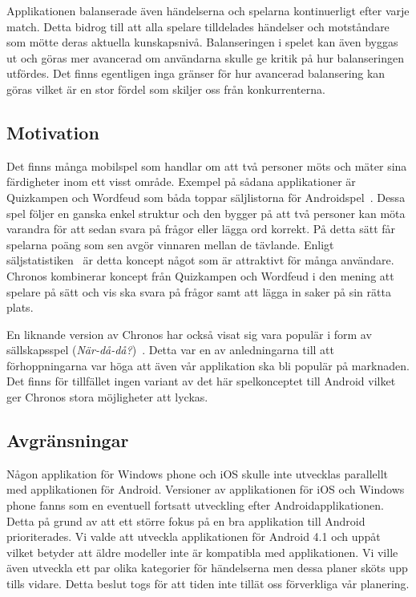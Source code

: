 \documentclass[a4paper, 11pt]{article}
\begin{document}
Applikationen balanserade även händelserna och spelarna kontinuerligt efter varje match. Detta bidrog till att alla spelare tilldelades händelser och motståndare som mötte deras aktuella kunskapsnivå. Balanseringen i spelet kan även byggas ut och göras mer avancerad om användarna skulle ge kritik på hur balanseringen utfördes. Det finns egentligen inga gränser för hur avancerad balansering kan göras vilket är en stor fördel som skiljer oss från konkurrenterna.


\subsection{Motivation}
Det finns många mobilspel som handlar om att två personer möts och mäter sina färdigheter inom ett visst område. Exempel på sådana applikationer är Quizkampen och Wordfeud som båda toppar säljlistorna för Androidspel~\cite{appsalesrating}. Dessa spel följer en ganska enkel struktur och den bygger på att två personer kan möta varandra för att sedan svara på frågor eller lägga ord korrekt. På detta sätt får spelarna poäng som sen avgör vinnaren mellan de tävlande. Enligt säljstatistiken~\cite{appsalesrating} är detta koncept något som är attraktivt för många användare. Chronos kombinerar koncept från Quizkampen och Wordfeud i den mening att spelare på sätt och vis ska svara på frågor samt att lägga in saker på sin rätta plats. 

En liknande version av Chronos har också visat sig vara populär i form av sällskapsspel (\textit{När-då-då?})~\cite{nardada}. Detta var en av anledningarna till att förhoppningarna var höga att även vår applikation ska bli populär på marknaden. Det finns för tillfället ingen variant av det här spelkonceptet till Android vilket ger Chronos stora möjligheter att lyckas.

\subsection{Avgränsningar}
Någon applikation för Windows phone och iOS skulle inte utvecklas parallellt med applikationen för Android. Versioner av applikationen för iOS och Windows phone fanns som en eventuell fortsatt utveckling efter Androidapplikationen. Detta på grund av att ett större fokus på en bra applikation till Android prioriterades. Vi valde att utveckla applikationen för Android 4.1 och uppåt vilket betyder att äldre modeller inte är kompatibla med applikationen.
Vi ville även utveckla ett par olika kategorier för händelserna men dessa planer sköts upp tills vidare. Detta beslut togs för att tiden inte tillät oss förverkliga vår planering.
\end{document}
